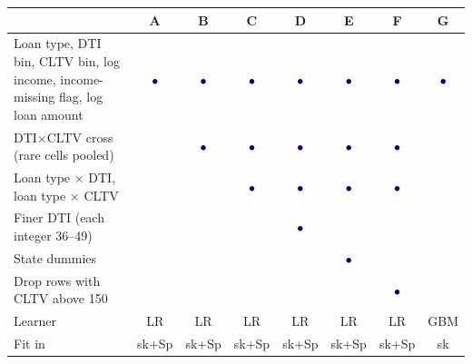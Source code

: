 \begin{tabular}{@{}p{6.4cm}ccccccc@{}}
\toprule
 & A & B & C & D & E & F & G \\
\midrule
Loan type, DTI bin, CLTV bin, log income, income-missing flag, log loan amount & \textcolor{navy}{$\bullet$} & \textcolor{navy}{$\bullet$} & \textcolor{navy}{$\bullet$} & \textcolor{navy}{$\bullet$} & \textcolor{navy}{$\bullet$} & \textcolor{navy}{$\bullet$} & \textcolor{navy}{$\bullet$} \\
DTI$\times$CLTV cross (rare cells pooled) &  & \textcolor{navy}{$\bullet$} & \textcolor{navy}{$\bullet$} & \textcolor{navy}{$\bullet$} & \textcolor{navy}{$\bullet$} & \textcolor{navy}{$\bullet$} &  \\
Loan type $\times$ DTI, loan type $\times$ CLTV &  &  & \textcolor{navy}{$\bullet$} & \textcolor{navy}{$\bullet$} & \textcolor{navy}{$\bullet$} & \textcolor{navy}{$\bullet$} &  \\
Finer DTI (each integer 36--49) &  &  &  & \textcolor{navy}{$\bullet$} &  &  &  \\
State dummies &  &  &  &  & \textcolor{navy}{$\bullet$} &  &  \\
Drop rows with CLTV above 150 &  &  &  &  &  & \textcolor{navy}{$\bullet$} &  \\
Learner & LR & LR & LR & LR & LR & LR & GBM \\
Fit in & sk+Sp & sk+Sp & sk+Sp & sk+Sp & sk+Sp & sk+Sp & sk \\
\bottomrule
\end{tabular}
